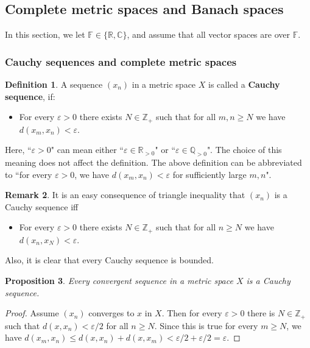 \documentclass[12pt,b5paper,notitlepage]{article}
\theoremstyle{definition}
\newtheorem{df}{Definition}[section]
\newtheorem{rem}[df]{Remark}
\theoremstyle{plain}
\newtheorem{pp}[df]{Proposition}
\newcommand{\Cbb}{\mathbb C}
\newcommand{\Zbb}{\mathbb Z}
\newcommand{\Qbb}{\mathbb Q}
\newcommand{\Rbb}{\mathbb R}
\newcommand{\Fbb}{\mathbb F}
\newcommand{\eps}{\varepsilon}
\numberwithin{equation}{section}
\begin{document}
\subsection{Complete metric spaces and Banach spaces}

In this section, we let $\Fbb\in\{\Rbb,\Cbb\}$, and assume that all vector spaces are over $\Fbb$.


\subsubsection{Cauchy sequences and complete metric spaces}

\begin{df}
A sequence $(x_n)$ in a metric space $X$ is called a \textbf{Cauchy sequence}, if:
\begin{itemize}
\item For every $\eps>0$  there exists $N\in\Zbb_+$ such that for all $m,n\geq N$ we have $d(x_m,x_n)<\eps$.
\end{itemize}
\end{df}

Here, ``$\eps>0$" can mean either ``$\eps\in\Rbb_{>0}$" or ``$\eps\in\Qbb_{>0}$". The choice of this meaning does not affect the definition. The above definition can be abbreviated to ``for every $\eps>0$, we have $d(x_m,x_n)<\eps$ for sufficiently large $m,n$". 

\begin{rem}
It is an easy consequence of triangle inequality that $(x_n)$ is a Cauchy sequence iff
\begin{itemize}
\item For every $\eps>0$ there exists $N\in\Zbb_+$ such that for all $n\geq N$ we have $d(x_n,x_N)<\eps$.
\end{itemize}
Also, it is clear that every Cauchy sequence is bounded.
\end{rem}


\begin{pp}\label{lb83}
Every convergent sequence in a metric space $X$ is a Cauchy sequence.
\end{pp}

\begin{proof}
Assume $(x_n)$ converges to $x$ in $X$. Then for every $\eps>0$ there is $N\in\Zbb_+$ such that $d(x,x_n)<\eps/2$ for all $n\geq N$. Since this is true for every $m\geq N$, we have $d(x_m,x_n)\leq d(x,x_n)+d(x,x_m)<\eps/2+\eps/2=\eps$.
\end{proof}
\end{document}
